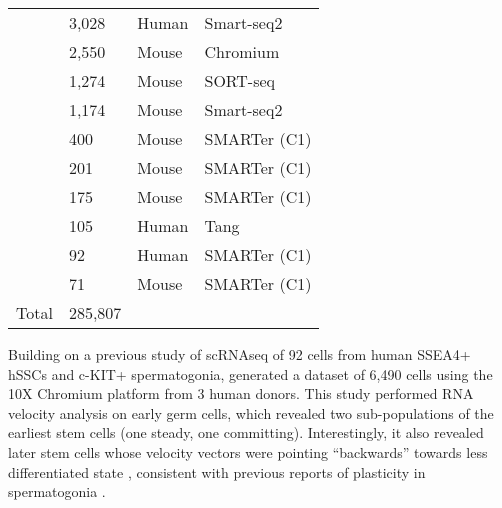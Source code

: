 \begin{table}[]
\begin{tabular}{@{}llll@{}}
		\cite{Wang2018SingleCell}           & 3,028   & Human          & Smart-seq2          \\
		\cite{Lukassen2018Characterization} & 2,550   & Mouse          & Chromium        \\
		\cite{Vertesy2019Dynamics}          & 1,274   & Mouse          & SORT-seq             \\
		\cite{Chen2018Singlecell}           & 1,174   & Mouse          & Smart-seq2              \\
		\cite{Stevant2018Deciphering}       & 400     & Mouse          & SMARTer (C1)     \\
		\cite{Song2016Homeobox}             & 201     & Mouse          & SMARTer (C1)      \\
		\cite{Makino2019Single}             & 175     & Mouse          & SMARTer (C1)             \\
		\cite{Neuhaus2017Singlecell}        & 105     & Human          & Tang                    \\
		\cite{Guo2017Chromatin}             & 92      & Human          & SMARTer (C1)      \\
		\cite{Liao2019Revealing}            & 71      & Mouse          & SMARTer (C1)           \\
		Total                                                & 285,807 &                &                             \\ \bottomrule
	\end{tabular}
\end{table}

Building on a previous study \parencite{Guo2017Chromatin} of scRNAseq of 92 cells from human SSEA4+ hSSCs and c-KIT+ spermatogonia, \cite{Guo2018adult} generated a dataset of 6,490 cells using the 10X Chromium platform from 3 human donors. This study performed RNA velocity analysis on early germ cells, which revealed two sub-populations of the earliest stem cells (one steady, one committing). Interestingly, it also revealed later stem cells whose velocity vectors were pointing ``backwards'' towards less differentiated state \parencite{Guo2018adult}, consistent with previous reports of plasticity in spermatogonia \parencite{Brawley2004Regeneration, Nakagawa2010Functional, Hara2014Mouse}.

